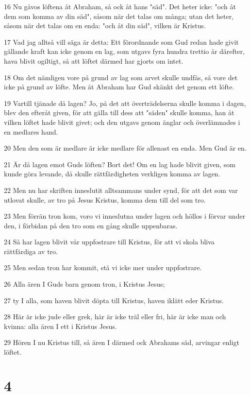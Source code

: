 \par 16 Nu gåvos löftena åt Abraham, så ock åt hans "säd". Det heter icke: "och åt dem som komma av din säd", såsom när det talas om många; utan det heter, såsom när det talas om en enda: "och åt din säd", vilken är Kristus.
\par 17 Vad jag alltså vill säga är detta: Ett förordnande som Gud redan hade givit gällande kraft kan icke genom en lag, som utgavs fyra hundra trettio år därefter, hava blivit ogiltigt, så att löftet därmed har gjorts om intet.
\par 18 Om det nämligen vore på grund av lag som arvet skulle undfås, så vore det icke på grund av löfte. Men åt Abraham har Gud skänkt det genom ett löfte.
\par 19 Vartill tjänade då lagen? Jo, på det att överträdelserna skulle komma i dagen, blev den efteråt given, för att gälla till dess att "säden" skulle komma, han åt vilken löftet hade blivit givet; och den utgavs genom änglar och överlämnades i en medlares hand.
\par 20 Men den som är medlare är icke medlare för allenast en enda. Men Gud är en.
\par 21 Är då lagen emot Guds löften? Bort det! Om en lag hade blivit given, som kunde göra levande, då skulle rättfärdigheten verkligen komma av lagen.
\par 22 Men nu har skriften inneslutit alltsammans under synd, för att det som var utlovat skulle, av tro på Jesus Kristus, komma dem till del som tro.
\par 23 Men förrän tron kom, voro vi inneslutna under lagen och höllos i förvar under den, i förbidan på den tro som en gång skulle uppenbaras.
\par 24 Så har lagen blivit vår uppfostrare till Kristus, för att vi skola bliva rättfärdiga av tro.
\par 25 Men sedan tron har kommit, stå vi icke mer under uppfostrare.
\par 26 Alla ären I Guds barn genom tron, i Kristus Jesus;
\par 27 ty I alla, som haven blivit döpta till Kristus, haven iklätt eder Kristus.
\par 28 Här är icke jude eller grek, här är icke träl eller fri, här är icke man och kvinna: alla ären I ett i Kristus Jesus.
\par 29 Hören I nu Kristus till, så ären I därmed ock Abrahams säd, arvingar enligt löftet.

\chapter{4}

